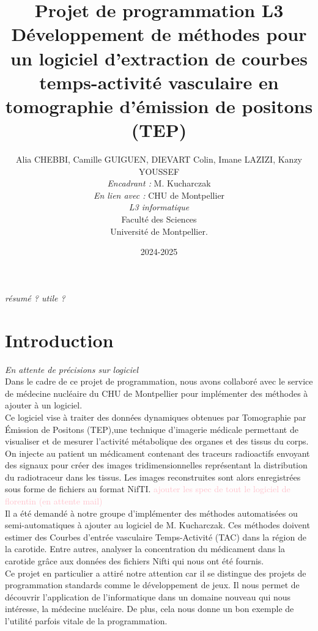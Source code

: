 \documentclass{article}
\title{Projet de programmation L3\\[0.5cm]Développement de méthodes pour un logiciel d'extraction de courbes temps-activité vasculaire en tomographie d'émission de positons (TEP)}
\author{Alia CHEBBI, Camille GUIGUEN, DIEVART Colin, Imane LAZIZI, Kanzy YOUSSEF\\[0.5cm]
    \emph{Encadrant :} M. Kucharczak\\
    \emph{En lien avec :} CHU de Montpellier\\[0.5cm]
    \emph{L3 informatique}\\Faculté des Sciences\\Université de Montpellier. }
\date{2024-2025}
\begin{document}
\maketitle

\begin{center}
    \emph{résumé ? utile ?}
\end{center}

\newpage
\dominitoc  %
\tableofcontents
\newpage


\section{Introduction} 
\emph{En attente de précisions sur logiciel}\\[0.5cm]
    Dans le cadre de ce projet de programmation, nous avons collaboré avec le service de médecine nucléaire 
    du CHU de Montpellier pour implémenter des méthodes à ajouter à un logiciel.\\

    \noindent Ce logiciel vise à traiter des données dynamiques obtenues par Tomographie par Émission de Positons (TEP),une technique d'imagerie médicale permettant de visualiser et de mesurer l'activité métabolique des organes et des tissus du corps. 
    On injecte au patient un médicament contenant des traceurs radioactifs envoyant des signaux pour créer des images tridimensionnelles représentant la distribution du radiotraceur dans les tissus.
    Les images reconstruites sont alors enregistrées sous forme de fichiers au format NifTI.
    \textcolor{pink}{ajouter les spec de tout le logiciel de florentin (en attente mail)}\\

    \noindent Il a été demandé à notre groupe d’implémenter des méthodes automatisées ou semi-automatiques à ajouter au logiciel 
    de M. Kucharczak. Ces méthodes doivent estimer des Courbes d'entrée vasculaire Temps-Activité (TAC) dans la région de 
    la carotide. Entre autres, analyser la concentration du médicament dans la carotide grâce aux données des fichiers 
    Nifti qui nous ont été fournis.\\

    \noindent Ce projet en particulier a attiré notre attention car il se distingue des projets de programmation standards comme le 
    développement de jeux. Il nous permet de découvrir l’application de l’informatique dans un domaine nouveau qui nous 
    intéresse, la médecine nucléaire. De plus, cela nous donne un bon exemple de l’utilité parfois vitale de la programmation.\\
\end{document}
